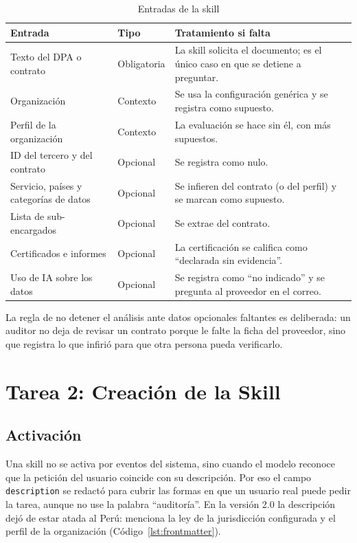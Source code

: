 \documentclass[12pt,letterpaper]{article}
\begin{document}
\begin{table}[H]
\centering
\small
\caption{Entradas de la skill}
\label{tab:entradas}
\begin{tabularx}{\linewidth}{@{}L{3.6cm} L{1.9cm} Y@{}}
\toprule
\textbf{Entrada} & \textbf{Tipo} & \textbf{Tratamiento si falta} \\
\midrule
Texto del DPA o contrato & Obligatoria & La skill solicita el documento; es el único caso en que se detiene a preguntar. \\
Organización & Contexto & Se usa la configuración genérica y se registra como supuesto. \\
Perfil de la organización & Contexto & La evaluación se hace sin él, con más supuestos. \\
ID del tercero y del contrato & Opcional & Se registra como nulo. \\
Servicio, países y categorías de datos & Opcional & Se infieren del contrato (o del perfil) y se marcan como supuesto. \\
Lista de sub-encargados & Opcional & Se extrae del contrato. \\
Certificados e informes & Opcional & La certificación se califica como ``declarada sin evidencia''. \\
Uso de IA sobre los datos & Opcional & Se registra como ``no indicado'' y se pregunta al proveedor en el correo. \\
\bottomrule
\end{tabularx}
\end{table}

La regla de no detener el análisis ante datos opcionales faltantes es deliberada: un auditor no deja de revisar un contrato porque le falte la ficha del proveedor, sino que registra lo que infirió para que otra persona pueda verificarlo.

\section{Tarea 2: Creación de la Skill}

\subsection{Activación}

Una skill no se activa por eventos del sistema, sino cuando el modelo reconoce que la petición del usuario coincide con su descripción. Por eso el campo \texttt{description} se redactó para cubrir las formas en que un usuario real puede pedir la tarea, aunque no use la palabra ``auditoría''. En la versión 2.0 la descripción dejó de estar atada al Perú: menciona la ley de la jurisdicción configurada y el perfil de la organización (Código~\ref{lst:frontmatter}).
\end{document}
